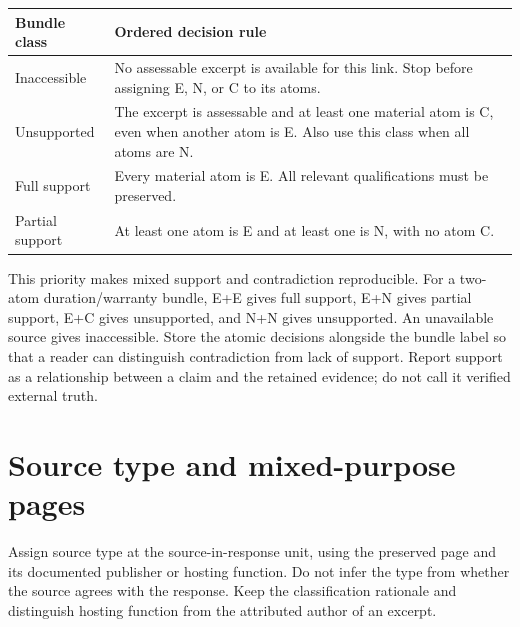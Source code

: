 \documentclass[10pt,a4paper]{article}
\begin{document}
\begin{tabularx}{\textwidth}{L{3.2cm}Y}
\toprule Bundle class & Ordered decision rule \\
\midrule
Inaccessible & No assessable excerpt is available for this link. Stop before assigning E, N, or C to its atoms. \\
Unsupported & The excerpt is assessable and at least one material atom is C, even when another atom is E. Also use this class when all atoms are N. \\
Full support & Every material atom is E. All relevant qualifications must be preserved. \\
Partial support & At least one atom is E and at least one is N, with no atom C. \\
\bottomrule
\end{tabularx}

This priority makes mixed support and contradiction reproducible. For a two-atom duration/warranty bundle, E+E gives full support, E+N gives partial support, E+C gives unsupported, and N+N gives unsupported. An unavailable source gives inaccessible. Store the atomic decisions alongside the bundle label so that a reader can distinguish contradiction from lack of support. Report support as a relationship between a claim and the retained evidence; do not call it verified external truth.

\medskip
\section{Source type and mixed-purpose pages}
Assign source type at the source-in-response unit, using the preserved page and its documented publisher or hosting function. Do not infer the type from whether the source agrees with the response. Keep the classification rationale and distinguish hosting function from the attributed author of an excerpt.
\end{document}
